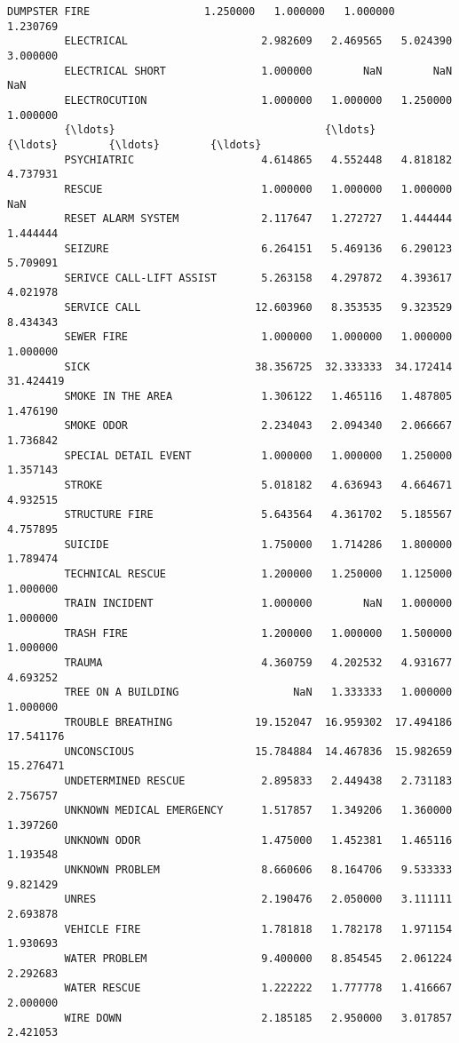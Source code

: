 \documentclass[11pt]{article}
\begin{document}
\begin{Verbatim}[commandchars=\\\{\}]
         DUMPSTER FIRE                  1.250000   1.000000   1.000000   1.230769   
         ELECTRICAL                     2.982609   2.469565   5.024390   3.000000   
         ELECTRICAL SHORT               1.000000        NaN        NaN        NaN   
         ELECTROCUTION                  1.000000   1.000000   1.250000   1.000000   
         {\ldots}                                 {\ldots}        {\ldots}        {\ldots}        {\ldots}   
         PSYCHIATRIC                    4.614865   4.552448   4.818182   4.737931   
         RESCUE                         1.000000   1.000000   1.000000        NaN   
         RESET ALARM SYSTEM             2.117647   1.272727   1.444444   1.444444   
         SEIZURE                        6.264151   5.469136   6.290123   5.709091   
         SERIVCE CALL-LIFT ASSIST       5.263158   4.297872   4.393617   4.021978   
         SERVICE CALL                  12.603960   8.353535   9.323529   8.434343   
         SEWER FIRE                     1.000000   1.000000   1.000000   1.000000   
         SICK                          38.356725  32.333333  34.172414  31.424419   
         SMOKE IN THE AREA              1.306122   1.465116   1.487805   1.476190   
         SMOKE ODOR                     2.234043   2.094340   2.066667   1.736842   
         SPECIAL DETAIL EVENT           1.000000   1.000000   1.250000   1.357143   
         STROKE                         5.018182   4.636943   4.664671   4.932515   
         STRUCTURE FIRE                 5.643564   4.361702   5.185567   4.757895   
         SUICIDE                        1.750000   1.714286   1.800000   1.789474   
         TECHNICAL RESCUE               1.200000   1.250000   1.125000   1.000000   
         TRAIN INCIDENT                 1.000000        NaN   1.000000   1.000000   
         TRASH FIRE                     1.200000   1.000000   1.500000   1.000000   
         TRAUMA                         4.360759   4.202532   4.931677   4.693252   
         TREE ON A BUILDING                  NaN   1.333333   1.000000   1.000000   
         TROUBLE BREATHING             19.152047  16.959302  17.494186  17.541176   
         UNCONSCIOUS                   15.784884  14.467836  15.982659  15.276471   
         UNDETERMINED RESCUE            2.895833   2.449438   2.731183   2.756757   
         UNKNOWN MEDICAL EMERGENCY      1.517857   1.349206   1.360000   1.397260   
         UNKNOWN ODOR                   1.475000   1.452381   1.465116   1.193548   
         UNKNOWN PROBLEM                8.660606   8.164706   9.533333   9.821429   
         UNRES                          2.190476   2.050000   3.111111   2.693878   
         VEHICLE FIRE                   1.781818   1.782178   1.971154   1.930693   
         WATER PROBLEM                  9.400000   8.854545   2.061224   2.292683   
         WATER RESCUE                   1.222222   1.777778   1.416667   2.000000   
         WIRE DOWN                      2.185185   2.950000   3.017857   2.421053   
         

\end{Verbatim}
\end{document}
